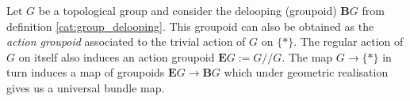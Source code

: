     \begin{construct}
        Let $G$ be a topological group and consider the delooping (groupoid) $\mathbf{B}G$ from definition \ref{cat:group_delooping}. This groupoid can also be obtained as the \textit{action groupoid} associated to the trivial action of $G$ on $\{\ast\}$. The regular action of $G$ on itself also induces an action groupoid $\mathbf{E}G:=G//G$. The map $G\rightarrow\{\ast\}$ in turn induces a map of groupoids $\mathbf{E}G\rightarrow\mathbf{B}G$ which under geometric realisation gives us a universal bundle map.
    \end{construct}
